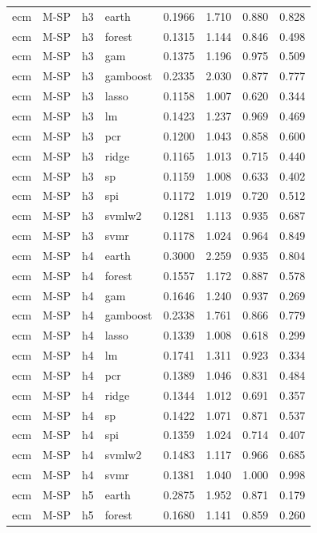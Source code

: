 \begin{ThreePartTable}
\begin{longtable}[t]{llclcccc}
\addlinespace
ecm & M-SP & h3 & earth & 0.1966 & 1.710 & 0.880 & 0.828\\
ecm & M-SP & h3 & forest & 0.1315 & 1.144 & 0.846 & 0.498\\
ecm & M-SP & h3 & gam & 0.1375 & 1.196 & 0.975 & 0.509\\
ecm & M-SP & h3 & gamboost & 0.2335 & 2.030 & 0.877 & 0.777\\
ecm & M-SP & h3 & lasso & 0.1158 & 1.007 & 0.620 & 0.344\\
ecm & M-SP & h3 & lm & 0.1423 & 1.237 & 0.969 & 0.469\\
ecm & M-SP & h3 & pcr & 0.1200 & 1.043 & 0.858 & 0.600\\
ecm & M-SP & h3 & ridge & 0.1165 & 1.013 & 0.715 & 0.440\\
ecm & M-SP & h3 & sp & 0.1159 & 1.008 & 0.633 & 0.402\\
ecm & M-SP & h3 & spi & 0.1172 & 1.019 & 0.720 & 0.512\\
ecm & M-SP & h3 & svmlw2 & 0.1281 & 1.113 & 0.935 & 0.687\\
ecm & M-SP & h3 & svmr & 0.1178 & 1.024 & 0.964 & 0.849\\
\addlinespace
ecm & M-SP & h4 & earth & 0.3000 & 2.259 & 0.935 & 0.804\\
ecm & M-SP & h4 & forest & 0.1557 & 1.172 & 0.887 & 0.578\\
ecm & M-SP & h4 & gam & 0.1646 & 1.240 & 0.937 & 0.269\\
ecm & M-SP & h4 & gamboost & 0.2338 & 1.761 & 0.866 & 0.779\\
ecm & M-SP & h4 & lasso & 0.1339 & 1.008 & 0.618 & 0.299\\
ecm & M-SP & h4 & lm & 0.1741 & 1.311 & 0.923 & 0.334\\
ecm & M-SP & h4 & pcr & 0.1389 & 1.046 & 0.831 & 0.484\\
ecm & M-SP & h4 & ridge & 0.1344 & 1.012 & 0.691 & 0.357\\
ecm & M-SP & h4 & sp & 0.1422 & 1.071 & 0.871 & 0.537\\
ecm & M-SP & h4 & spi & 0.1359 & 1.024 & 0.714 & 0.407\\
ecm & M-SP & h4 & svmlw2 & 0.1483 & 1.117 & 0.966 & 0.685\\
ecm & M-SP & h4 & svmr & 0.1381 & 1.040 & 1.000 & 0.998\\
\addlinespace
ecm & M-SP & h5 & earth & 0.2875 & 1.952 & 0.871 & 0.179\\
ecm & M-SP & h5 & forest & 0.1680 & 1.141 & 0.859 & 0.260\\

\end{longtable}
\end{ThreePartTable}
